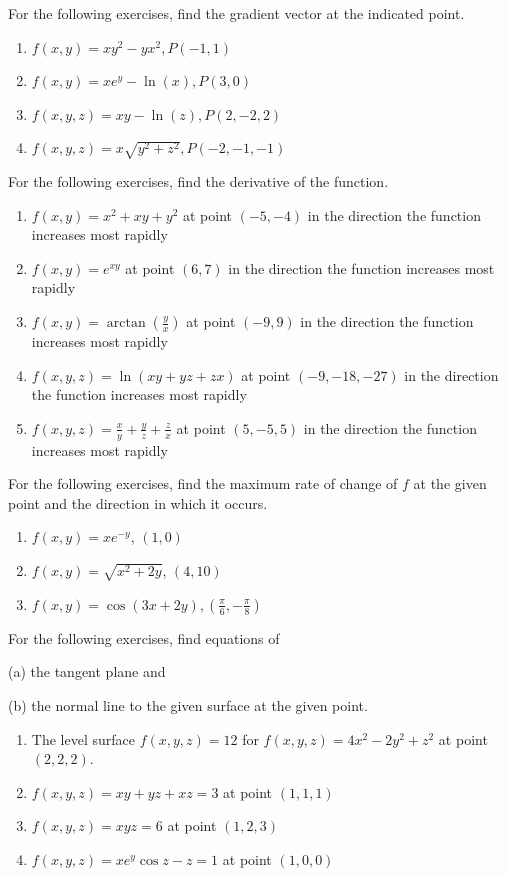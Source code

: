 \documentclass{exercises}
\begin{document}
For the following exercises, find the gradient vector at the indicated point.

\begin{enumerate}[resume]
\item $f(x,y)=xy^{2}-yx^{2},P(-1,1)$
\item $f(x,y)=xe^{y}-\ln(x),P(3,0)$
\item $f(x,y,z)=xy-\ln(z),P(2,-2,2)$
\item $f(x,y,z)=x\sqrt{y^{2}+z^{2}},P(-2,-1,-1)$
\end{enumerate}

For the following exercises, find the derivative of the function.

\begin{enumerate}[resume]
\item $f(x,y)=x^{2}+xy+y^{2}$ at point $(-5,-4)$ in the direction the function increases most rapidly
\item $f(x,y)=e^{xy}$ at point $(6,7)$ in the direction the function increases most rapidly
\item $f(x,y)=\arctan(\frac{y}{x})$ at point $(-9,9)$ in the direction the function increases most rapidly
\item $f(x,y,z)=\ln(xy+yz+zx)$ at point $(-9,-18,-27)$ in the direction the function increases most rapidly
\item $f(x,y,z)=\frac{x}{y}+\frac{y}{z}+\frac{z}{x}$ at point $(5,-5,5)$ in the direction the function increases most rapidly
\end{enumerate}

For the following exercises, find the maximum rate of change of $f$ at the given point and the direction in which it occurs.

\begin{enumerate}[resume]
\item $f(x,y)=xe^{-y}$, $(1,0)$
\item $f(x,y)=\sqrt{x^{2}+2y}$, $(4,10)$
\item $f(x,y)=\cos(3x+2y),(\frac{\pi}{6},-\frac{\pi}{8})$
\end{enumerate}

For the following exercises, find equations of


(a) the tangent plane and


(b) the normal line to the given surface at the given point.

\begin{enumerate}[resume]
\item The level surface $f(x,y,z)=12$ for $f(x,y,z)=4x^{2}-2y^{2}+z^{2}$ at point $(2,2,2)$.
\item $f(x,y,z)=xy+yz+xz=3$ at point $(1,1,1)$
\item $f(x,y,z)=xyz=6$ at point $(1,2,3)$
\item $f(x,y,z)=xe^{y}\cos z-z=1$ at point $(1,0,0)$
\end{enumerate}
\end{document}
